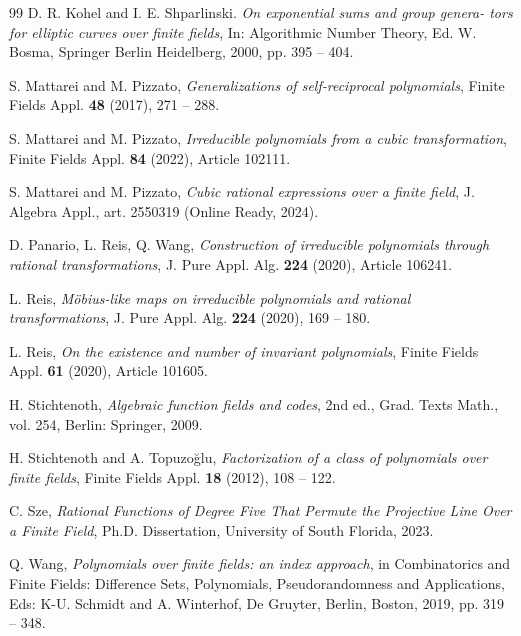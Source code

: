 \documentclass{amsart}
\numberwithin{equation}{section}
\theoremstyle{definition}
\begin{document}
\begin{thebibliography}{99}
D. R. Kohel and I. E. Shparlinski. {\it On exponential sums and group genera-
tors for elliptic curves over finite fields}, In: Algorithmic Number Theory, Ed. 
W. Bosma, Springer Berlin Heidelberg, 2000, pp. 395 -- 404.

S. Mattarei and M. Pizzato, {\it Generalizations of self-reciprocal polynomials}, Finite Fields Appl. {\bf 48} (2017), 271 -- 288.

S. Mattarei and M. Pizzato, {\it Irreducible polynomials from a cubic transformation}, Finite Fields Appl. {\bf 84} (2022), Article 102111.


S. Mattarei and M. Pizzato, {\it Cubic rational expressions over a finite field}, J. Algebra Appl., art. 2550319 (Online Ready, 2024).%

D. Panario, L. Reis, Q. Wang, {\it Construction of irreducible
polynomials through rational transformations}, J. Pure Appl. Alg. {\bf 224} (2020),  Article 106241.

L. Reis, {\it M\"obius-like maps on irreducible polynomials and rational
transformations}, J. Pure Appl. Alg. {\bf 224} (2020), 169 -- 180.

L. Reis, {\it On the existence and number of invariant polynomials}, Finite Fields Appl. {\bf 61} (2020), Article 101605. 

H. Stichtenoth, \textit{Algebraic function fields and codes}, 2nd ed., Grad. Texts Math., vol. 254, Berlin: Springer, 2009. 

H. Stichtenoth and A. Topuzo\u glu, {\it Factorization of a class of polynomials over finite fields}, Finite Fields Appl. {\bf 18} (2012), 108 -- 122.



C. Sze, {\it Rational Functions of Degree Five That Permute the Projective Line Over a Finite Field}, Ph.D. Dissertation, University of South Florida, 2023.


Q. Wang, {\it Polynomials over finite fields: an index approach}, in Combinatorics and Finite Fields: Difference Sets, Polynomials, Pseudorandomness and Applications, Eds:  K-U. Schmidt and A. Winterhof,  De Gruyter, Berlin, Boston, 2019, pp. 319 -- 348.

\end{thebibliography}



\end{document}
